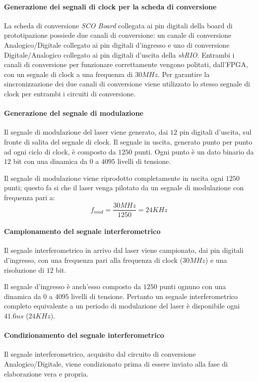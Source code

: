 \paragraph{Generazione dei segnali di clock per la scheda di conversione}
La scheda di conversione \textit{SCO Board} collegata ai pin digitali della board di prototipazione possiede due canali di conversione: un canale di conversione Analogico/Digitale collegato ai pin digitali d'ingresso e uno di conversione Digitale/Analogico collegato ai pin digitali d'uscita della \textit{sbRIO}. Entrambi i canali di conversione per funzionare correttamente vengono politati, dall'FPGA, con un segnale di clock a una frequenza di $30MHz$. Per garantire la sincronizzazione dei due canali di conversione viene utilizzato lo stesso segnale di clock per entrambi i circuiti di conversione.

\paragraph{Generazione del segnale di modulazione}
Il segnale di modulazione del laser viene generato, dai $12$ pin digitali d'uscita, sul fronte di salita del segnale di clock. Il segnale in uscita, generato punto per punto ad ogni ciclo di clock, è composto da $1250$ punti. Ogni punto è un dato binario da $12$ bit con una dinamica da $0$ a $4095$ livelli di tensione.

Il segnale di modulazione viene riprodotto completamente in uscita ogni $1250$ punti; questo fa si che il laser venga pilotato da un segnale di modulazione con frequenza pari a:
\begin{equation}
	f_{mod} = \frac{30MHz}{1250} = 24KHz
\end{equation}

\paragraph{Campionamento del segnale interferometrico}
Il segnale interferometrico in arrivo dal laser viene campionato, dai pin digitali d'ingresso, con una frequenza pari alla frequenza di clock ($30MHz$) e una risoluzione di $12$ bit.

Il segnale d'ingresso è anch'esso composto da $1250$ punti ognuno con una dinamica da $0$ a $4095$ livelli di tensione. Pertanto un segnale interferometrico completo equivalente a un periodo di modulazione del laser è disponibile ogni $41.6us$ ($24KHz$).

\paragraph{Condizionamento del segnale interferometrico}
Il segnale interferometrico, acquisito dal circuito di conversione Analogico/Digitale, viene condizionato prima di essere inviato alla fase di elaborazione vera e propria.

